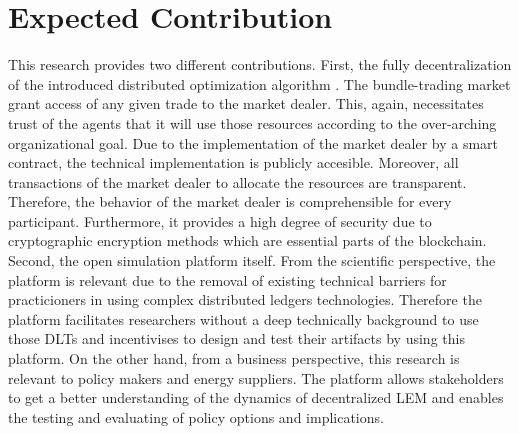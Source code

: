 \section{Expected Contribution}
\label{sec:expected_contribution}

This research provides two different contributions. 
First, the fully decentralization of the introduced distributed 
optimization algorithm . 
The bundle-trading market grant access of any given trade to the market dealer. 
This, again, necessitates trust of the agents that it will use those resources 
according to the over-arching organizational goal. Due to the implementation 
of the market dealer by a smart contract, the technical implementation 
is publicly accesible. Moreover, all transactions of the market dealer 
to allocate the resources are transparent. Therefore, the behavior of the 
market dealer is comprehensible for every participant. Furthermore, it provides 
a high degree of security due to cryptographic encryption methods which are essential 
parts of the blockchain.
Second, the open simulation platform itself. From the scientific perspective, 
the platform is relevant due to the removal of existing technical barriers 
for practicioners in using complex distributed ledgers technologies. 
Therefore the platform facilitates researchers without a deep 
technically background to use those DLTs and incentivises to design 
and test their artifacts by using this platform. 
On the other hand, from a business perspective, this research is 
relevant to policy makers and energy suppliers. The platform allows 
stakeholders to get a better understanding of the dynamics of decentralized 
LEM and enables the testing and evaluating of policy options and implications. 

\clearpage